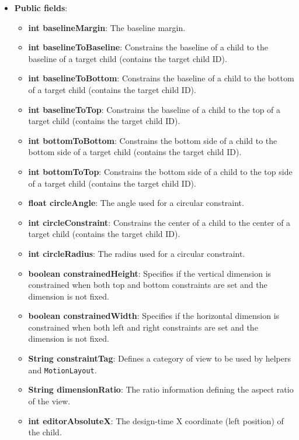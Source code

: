 \documentclass{report}
\begin{document}
\begin{itemize}
\begin{itemize}
            \end{itemize}
        \item \textbf{Public fields}:
            \begin{itemize}
                \item \textbf{int baselineMargin}: The baseline margin.
                \item \textbf{int baselineToBaseline}: Constrains the baseline of a child to the baseline of a target child (contains the target child ID).
                \item \textbf{int baselineToBottom}: Constrains the baseline of a child to the bottom of a target child (contains the target child ID).
                \item \textbf{int baselineToTop}: Constrains the baseline of a child to the top of a target child (contains the target child ID).
                \item \textbf{int bottomToBottom}: Constrains the bottom side of a child to the bottom side of a target child (contains the target child ID).
                \item \textbf{int bottomToTop}: Constrains the bottom side of a child to the top side of a target child (contains the target child ID).
                \item \textbf{float circleAngle}: The angle used for a circular constraint.
                \item \textbf{int circleConstraint}: Constrains the center of a child to the center of a target child (contains the target child ID).
                \item \textbf{int circleRadius}: The radius used for a circular constraint.
                \item \textbf{boolean constrainedHeight}: Specifies if the vertical dimension is constrained when both top and bottom constraints are set and the dimension is not fixed.
                \item \textbf{boolean constrainedWidth}: Specifies if the horizontal dimension is constrained when both left and right constraints are set and the dimension is not fixed.
                \item \textbf{String constraintTag}: Defines a category of view to be used by helpers and \texttt{MotionLayout}.
                \item \textbf{String dimensionRatio}: The ratio information defining the aspect ratio of the view.
                \item \textbf{int editorAbsoluteX}: The design-time X coordinate (left position) of the child.

\end{itemize}
\end{itemize}
\end{document}
